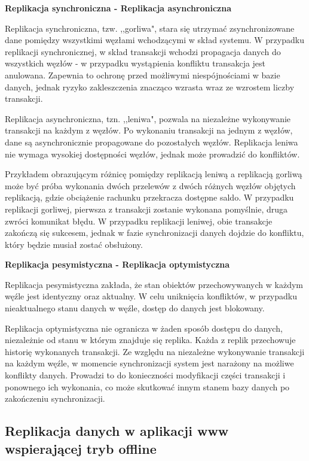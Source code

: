 \setlength{\parskip}{10pt plus 1pt minus 1pt}
\textbf{Replikacja synchroniczna - Replikacja asynchroniczna}
\setlength{\parskip}{10pt plus 1pt minus 1pt}

Replikacja synchroniczna, tzw. ,,gorliwa", stara się utrzymać zsynchronizowane dane pomiędzy wszystkimi węzłami wchodzącymi w skład systemu. W przypadku replikacji synchronicznej, w skład transakcji wchodzi propagacja danych do wszystkich węzłów - w przypadku wystąpienia konfliktu transakcja jest anulowana. Zapewnia to ochronę przed możliwymi niespójnościami w bazie danych, jednak ryzyko zakleszczenia znacząco wzrasta wraz ze wzrostem liczby transakcji.

Replikacja asynchroniczna, tzn. ,,leniwa", pozwala na niezależne wykonywanie transakcji na każdym z węzłów. Po wykonaniu transakcji na jednym z węzłów, dane są asynchronicznie propagowane do pozostałych węzłów. Replikacja leniwa nie wymaga wysokiej dostępności węzłów, jednak może prowadzić do konfliktów.

Przykładem obrazującym różnicę pomiędzy replikacją leniwą a replikacją gorliwą może być próba wykonania dwóch przelewów z dwóch różnych węzłów objętych replikacją, gdzie obciążenie rachunku przekracza dostępne saldo. W przypadku replikacji gorliwej, pierwsza z transakcji zostanie wykonana pomyślnie, druga zwróci komunikat błędu. W przypadku replikacji leniwej, obie transakcje zakończą się sukcesem, jednak w fazie synchronizacji danych dojdzie do konfliktu, który będzie musiał zostać obsłużony.

\setlength{\parskip}{10pt plus 1pt minus 1pt}
\textbf{Replikacja pesymistyczna - Replikacja optymistyczna}
\setlength{\parskip}{10pt plus 1pt minus 1pt}

Replikacja pesymistyczna zakłada, że stan obiektów przechowywanych w każdym węźle jest identyczny oraz aktualny. W celu uniknięcia konfliktów, w przypadku nieaktualnego stanu danych w węźle, dostęp do danych jest blokowany.

Replikacja optymistyczna nie ogranicza w żaden sposób dostępu do danych, niezależnie od stanu w którym znajduje się replika. Każda z replik przechowuje historię wykonanych transakcji. Ze względu na niezależne wykonywanie transakcji na każdym węźle, w momencie synchronizacji system jest narażony na możliwe konflikty danych. Prowadzi to do konieczności modyfikacji części transakcji i ponownego ich wykonania, co może skutkować innym stanem bazy danych po zakończeniu synchronizacji.

\subsection{Replikacja danych w aplikacji www wspierającej tryb offline}
\label{sec:replDanWAplWWWWspTrybOffline}

